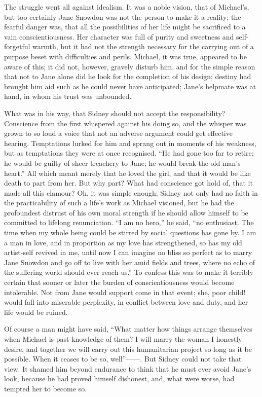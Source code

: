 The struggle went all against idealism. It was a noble vision, that of
Michael's, but too certainly Jane Snowdon was not the person to make it
a reality; the fearful danger was, that all the possibilities of her
life might be sacrificed to a vain conscientiousness. Her character was
full of purity and sweetness and self-forgetful warmth, but it had not
the strength necessary for the carrying out of a purpose beset with
difficulties and perils. Michael, it was true, appeared to be aware of
this; it did not, however, gravely disturb
{\protect\hypertarget{273}{}{}}him, and for the simple reason that not
to Jane alone did he look for the completion of his design; destiny had
brought him aid such as he could never have anticipated; Jane's helpmate
was at hand, in whom his trust was unbounded.

What was in his way, that Sidney should not accept the responsibility?
Conscience from the first whispered against his doing so, and the
whisper was grown to so loud a voice that not an adverse argument could
get effective hearing. Temptations lurked for him and sprang out in
moments of his weakness, but as temptations they were at once
recognised. ``He had gone too far to retire; he would be guilty of sheer
treachery to Jane; he would break the old man's heart.'' All which meant
merely that he loved the girl, and that it would be like death to part
from her. But why part? What had conscience got hold of, that it made
all this clamour? Oh, it was simple enough; Sidney not only had no faith
in the practicability of such a life's work as Michael visioned, but he
had the profoundest distrust {\protect\hypertarget{274}{}{}}of his own
moral strength if he should allow himself to be committed to lifelong
renunciation. ``I am no hero,'' he said, ``no enthusiast. The time when
my whole being could be stirred by social questions has gone by. I am a
man in love, and in proportion as my love has strengthened, so has my
old artist-self revived in me, until now I can imagine no bliss so
perfect as to marry Jane Snowdon and go off to live with her amid fields
and trees, where no echo of the suffering world should ever reach us.''
To confess this was to make it terribly certain that sooner or later the
burden of conscientiousness would become intolerable. Not from Jane
would support come in that event; she, poor child! would fall into
miserable perplexity, in conflict between love and duty, and her life
would be ruined.

Of course a man might have said, ``What matter how things arrange
themselves when Michael is past knowledge of them? I will marry the
woman I honestly desire, and together we will carry out this
humanitarian {\protect\hypertarget{275}{}{}}project so long as it be
possible. When it ceases to be so, well''{{------}}. But Sidney could
not take that view. It shamed him beyond endurance to think that he must
ever avoid Jane's look, because he had proved himself dishonest, and,
what were worse, had tempted her to become so.

